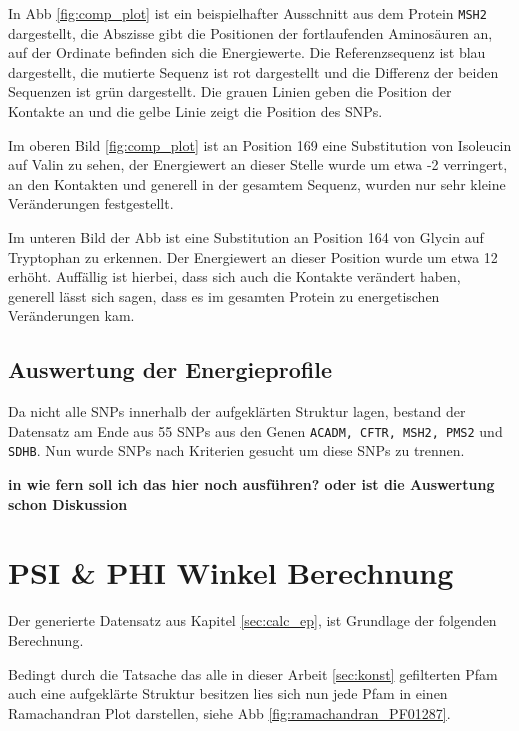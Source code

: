 In \ac{Abb} \ref{fig:comp_plot} ist ein beispielhafter Ausschnitt aus dem Protein \texttt{MSH2} dargestellt, die Abszisse gibt die Positionen der fortlaufenden Aminosäuren an, auf der Ordinate befinden sich die Energiewerte. Die Referenzsequenz ist blau dargestellt, die mutierte Sequenz ist rot dargestellt und die Differenz der beiden Sequenzen ist grün dargestellt. Die grauen Linien geben die Position der Kontakte an und die gelbe Linie zeigt die Position des \ac{SNPs}.

Im oberen Bild \ref{fig:comp_plot} ist an Position 169 eine Substitution von Isoleucin auf Valin zu sehen, der Energiewert an dieser Stelle wurde um etwa -2 verringert, an den Kontakten und generell in der gesamtem Sequenz, wurden nur sehr kleine Veränderungen festgestellt.

Im unteren Bild der \ac{Abb} ist eine Substitution an Position 164 von Glycin auf Tryptophan zu erkennen. Der Energiewert an dieser Position wurde um etwa 12 erhöht. Auffällig ist hierbei, dass sich auch die Kontakte verändert haben, generell lässt sich sagen, dass es im gesamten Protein zu energetischen Veränderungen kam.


\subsection{Auswertung der Energieprofile}

Da nicht alle SNPs innerhalb der aufgeklärten Struktur lagen, bestand der Datensatz am Ende aus 55 \ac{SNPs} aus den Genen \texttt{ACADM, CFTR, MSH2, PMS2} und \texttt{SDHB}. Nun wurde \ac{SNPs} nach Kriterien gesucht um diese SNPs zu trennen.


\textbf{in wie fern soll ich das hier noch ausführen? oder ist die Auswertung schon Diskussion}





\newpage
\section{PSI \& PHI Winkel Berechnung}

Der generierte Datensatz aus Kapitel \ref{sec:calc_ep}, ist Grundlage der folgenden Berechnung.

Bedingt durch die Tatsache das alle in dieser Arbeit \ref{sec:konst} gefilterten \ac{Pfam} auch eine aufgeklärte Struktur besitzen lies sich nun jede \ac{Pfam} in einen Ramachandran Plot darstellen, siehe \ac{Abb} \ref{fig:ramachandran_PF01287}.

